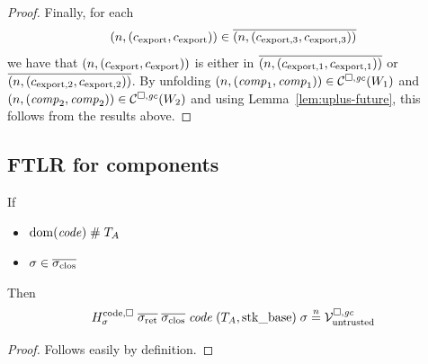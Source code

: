 \documentclass[a4paper]{article}
\begin{document}
\begin{proof}
  Finally, for each
  \begin{equation*}
    \left(n,(c_{\mathrm{export}},c_{\mathrm{export}})\right) \in \overline{\left(n,(c_{\mathrm{export},3},c_{\mathrm{export},3})\right)}
  \end{equation*}
  we have that $\left(n,(c_{\mathrm{export}},c_{\mathrm{export}})\right)$ is either in $\overline{\left(n,(c_{\mathrm{export},1},c_{\mathrm{export},1})\right)}$ or $\overline{\left(n,(c_{\mathrm{export},2},c_{\mathrm{export},2})\right)}$.
  By unfolding $\left(n,(\mathit{comp}_1,\mathit{comp}_1)\right) \in \mathcal{C}^{\square,\mathit{gc}}(W_1)$ and $\left(n,(\mathit{comp}_2,\mathit{comp}_2)\right) \in \mathcal{C}^{\square,\mathit{gc}}(W_2)$ and using Lemma~\ref{lem:uplus-future}, this follows from the results above.
\end{proof}

\subsection{FTLR for components}
\label{sec:ftlr-for-comps}

\begin{lemma}
  \label{lem:untrusted-codereg-sealed-vals-safe}
  If
  \begin{itemize}
  \item $\mathrm{dom}(\mathit{code}) \mathrel{\#} T_{A}$
  \item $\sigma \in \sigcloss$
  \end{itemize}
  Then
  \begin{equation*}
    H^\mathrm{code,\square}_\sigma \; \sigrets \; \sigcloss \; \code \; (\ta,\stkb) \; \sigma \nequal \lrv
  \end{equation*}
\end{lemma}
\begin{proof}
  Follows easily by definition.
\end{proof}
\end{document}
